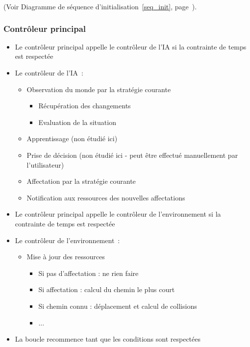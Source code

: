 (Voir Diagramme de séquence d'initialisation~\ref{seq_init}, page~\pageref{seq_init}).

%
\subsubsection{Contrôleur principal}

	\begin{itemize}
	\setlength{\itemsep}{5pt}
	\item Le contrôleur principal appelle le contrôleur de l'IA si la contrainte de temps est respectée
	\item Le contrôleur de l'IA~:
		\begin{itemize}
		\setlength{\itemsep}{2pt}
		\item Observation du monde par la stratégie courante
		    \begin{itemize}
		    \item Récupération des changements
		    \item Evaluation de la situation
		    \end{itemize}
		\item Apprentissage (non étudié ici)
		\item Prise de décision (non étudié ici - peut être effectué manuellement par l'utilisateur)
		\item Affectation par la stratégie courante
		\item Notification aux ressources des nouvelles affectations
		\end{itemize}
	\item Le contrôleur principal appelle le contrôleur de l'environnement si la contrainte de temps est respectée
	\item Le contrôleur de l'environnement~:
		\begin{itemize}
		\item Mise à jour des ressources
		    \begin{itemize}
		    \item Si pas d'affectation : ne rien faire
		    \item Si affectation : calcul du chemin le plus court
		    \item Si chemin connu : déplacement et calcul de collisions
		    \item ...
		    \end{itemize}
		\end{itemize}
	\item La boucle recommence tant que les conditions sont respectées\\
	\end{itemize}
